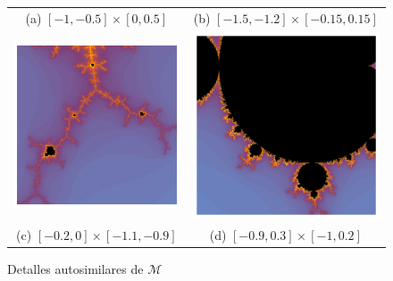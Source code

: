 \begin{figure}[ht]
\begin{tabular}{cc}
  (a) $[-1,-0.5]\times[0,0.5]$ & (b) $[-1.5,-1.2]\times[-0.15,0.15]$ \\[6pt]
  \includegraphics[scale=0.4]{./img/C3/mandelbrot-autosimilar-3.png} &   \includegraphics[scale=0.4]{./img/C3/mandelbrot-autosimilar-4.png} \\
  (c) $[-0.2,0]\times[-1.1,-0.9]$ & (d) $[-0.9,0.3]\times[-1,0.2]$ \\[6pt]
  \end{tabular}
  \caption{Detalles autosimilares de $\mathcal{M}$}
  \label{fig:detalles-mandelbrot}
\end{figure}

